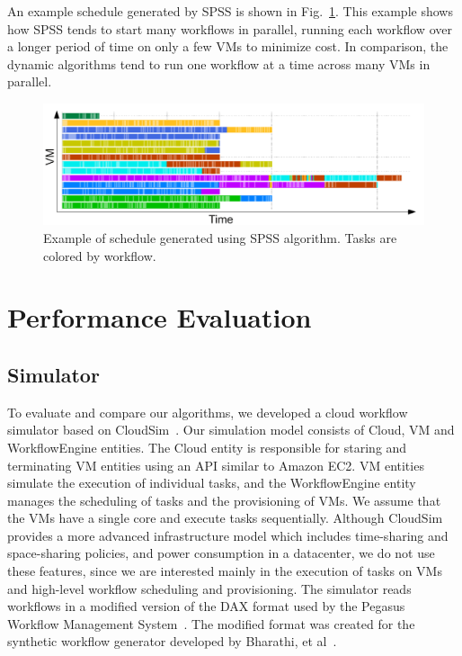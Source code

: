 \documentclass{sig-alternate}
\begin{document}
An example schedule generated by SPSS is shown in Fig.~\ref{fig:spss-example}.
This example shows how SPSS tends to start many workflows in parallel, running
each workflow over a longer period of time on only a few VMs to minimize cost. 
In comparison, the dynamic algorithms tend to run one workflow at a time across 
many VMs in parallel.

\begin{figure}[htb] 
\centering
\includegraphics[width=1.0\columnwidth]{figures/spss-gantt}
 \caption{Example of schedule generated using SPSS algorithm. Tasks are colored by workflow. }
\label{fig:spss-example}
\end{figure}



\section{Performance Evaluation}
\label{sec:performance}



\subsection{Simulator}

To evaluate and compare our algorithms, we developed a cloud workflow simulator based on
CloudSim~\cite{Calheiros11}. Our simulation model consists of Cloud, VM and WorkflowEngine 
entities. The Cloud entity is responsible for staring and terminating VM entities using 
an API similar to Amazon EC2. VM entities simulate the execution of individual tasks,
and the WorkflowEngine entity manages the scheduling of tasks and the provisioning of
VMs. We assume that the VMs have a single core and execute tasks sequentially. Although 
CloudSim provides a more advanced infrastructure model which includes time-sharing and 
space-sharing policies, and power consumption in a datacenter, we do not use these 
features, since we are interested mainly in the execution of tasks on VMs and high-level 
workflow scheduling and provisioning. The simulator reads workflows in a modified version of
the DAX format used by the Pegasus Workflow Management System~\cite{Deelman2005}. The modified format was
created for the synthetic workflow generator developed by Bharathi, et al~\cite{Bharathi08}.
\end{document}
